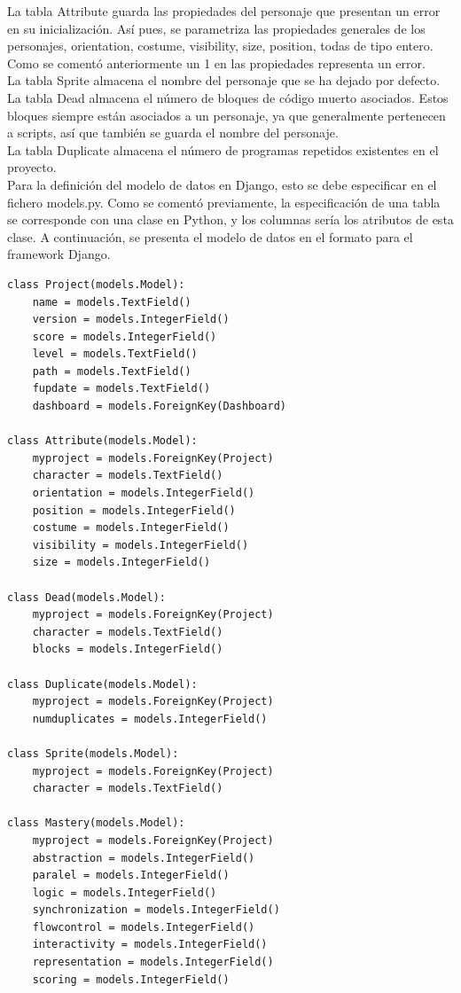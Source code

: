\documentclass[a4paper, 12pt]{book}
\begin{document}
La tabla Attribute guarda las propiedades del personaje que presentan un error en su 
inicialización. Así pues, se parametriza las propiedades generales de los personajes,
orientation, costume, visibility, size, position, todas de tipo entero. Como se 
comentó anteriormente un 1 en las propiedades representa un error. \\

La tabla Sprite almacena el nombre del personaje que se ha dejado por defecto. \\

La tabla Dead almacena el número de bloques de código muerto asociados. Estos bloques
siempre están asociados a un personaje, ya que generalmente pertenecen a scripts, así
que también se guarda el nombre del personaje. \\

La tabla Duplicate almacena el número de programas repetidos existentes en el proyecto. \\

Para la definición del modelo de datos en Django, esto se debe especificar en el fichero
models.py. Como se comentó previamente, la especificación de una tabla se corresponde con
una clase en Python, y los columnas sería los atributos de esta clase. A continuación, se
presenta el modelo de datos en el formato para el framework Django.


\begingroup
\fontsize{9pt}{10pt}\selectfont
\begin{verbatim}
class Project(models.Model):
	name = models.TextField()
	version = models.IntegerField()
	score = models.IntegerField()
	level = models.TextField()
	path = models.TextField()
	fupdate = models.TextField()
	dashboard = models.ForeignKey(Dashboard)
	
class Attribute(models.Model):
	myproject = models.ForeignKey(Project)
	character = models.TextField()
	orientation = models.IntegerField()
	position = models.IntegerField()
	costume = models.IntegerField()
	visibility = models.IntegerField()
	size = models.IntegerField()

class Dead(models.Model):
	myproject = models.ForeignKey(Project)
	character = models.TextField()
	blocks = models.IntegerField()

class Duplicate(models.Model):
	myproject = models.ForeignKey(Project)
	numduplicates = models.IntegerField()

class Sprite(models.Model):
	myproject = models.ForeignKey(Project)
	character = models.TextField()

class Mastery(models.Model):
	myproject = models.ForeignKey(Project)
	abstraction = models.IntegerField()
	paralel = models.IntegerField()
	logic = models.IntegerField()
	synchronization = models.IntegerField()
	flowcontrol = models.IntegerField()
	interactivity = models.IntegerField()
	representation = models.IntegerField()
	scoring = models.IntegerField()	

\end{verbatim}
\endgroup
\end{document}
